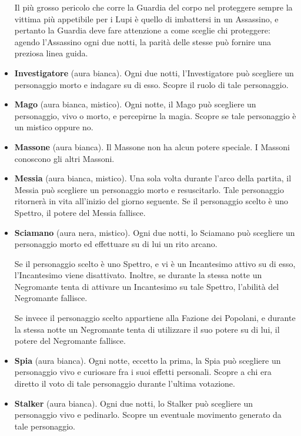\documentclass[a4paper,10pt]{article}
\begin{document}
\begin{itemize}
	Il più grosso pericolo che corre la Guardia del corpo nel proteggere sempre la vittima più appetibile per i Lupi è quello di imbattersi in un Assassino, e pertanto la Guardia deve fare attenzione a come sceglie chi proteggere: agendo l'Assassino ogni due notti, la parità delle stesse può fornire una preziosa linea guida.
		
	\item {\bf Investigatore} (aura bianca). Ogni due notti, l'Investigatore può scegliere un personaggio morto e indagare su di esso. Scopre il ruolo di tale personaggio.
	
	\item {\bf Mago} (aura bianca, mistico). Ogni notte, il Mago può scegliere un personaggio, vivo o morto, e percepirne la magia. Scopre se tale personaggio è un mistico oppure no.
	
	\item {\bf Massone} (aura bianca). Il Massone non ha alcun potere speciale. I Massoni conoscono gli altri Massoni.
	
	\item {\bf Messia} (aura bianca, mistico). Una sola volta durante l'arco della partita, il Messia può scegliere un personaggio morto e resuscitarlo. Tale personaggio ritornerà in vita all'inizio del giorno seguente. Se il personaggio scelto è uno Spettro, il potere del Messia fallisce.
	
	\item{\bf Sciamano} (aura nera, mistico). Ogni due notti, lo Sciamano può scegliere un personaggio morto ed effettuare su di lui un rito arcano.
	
	Se il personaggio scelto è uno Spettro, e vi è un Incantesimo attivo su di esso, l'Incantesimo viene disattivato. Inoltre, se durante la stessa notte un Negromante tenta di attivare un Incantesimo su tale Spettro, l'abilità del Negromante fallisce.
	
	Se invece il personaggio scelto appartiene alla Fazione dei Popolani, e durante la stessa notte un Negromante tenta di utilizzare il suo potere su di lui, il potere del Negromante fallisce.
	
	\item {\bf Spia} (aura bianca). Ogni notte, eccetto la prima, la Spia può scegliere un personaggio vivo e curiosare fra i suoi effetti personali. Scopre a chi era diretto il voto di tale personaggio durante l'ultima votazione.
	
	\item {\bf Stalker} (aura bianca). Ogni due notti, lo Stalker può scegliere un personaggio vivo e pedinarlo. Scopre un eventuale movimento generato da tale personaggio.
	

\end{itemize}
\end{document}
